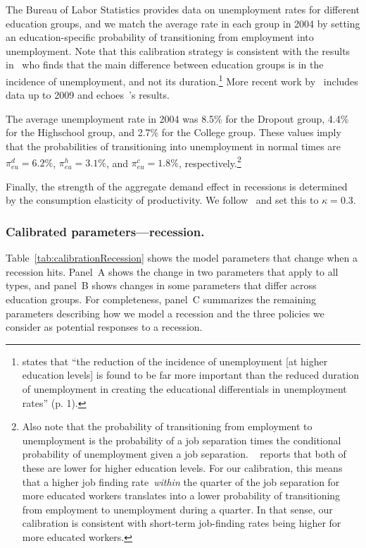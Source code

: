 \documentclass[\latexroot/\projectname]{subfiles}
\begin{document}
The Bureau of Labor Statistics provides data on unemployment rates for different education groups, and we match the average rate in each group in 2004 by setting an education-specific probability of transitioning from employment into unemployment.
Note that this calibration strategy is consistent with the results in~\cite{mincer1991education} who finds that the main difference between education groups is in the incidence of unemployment, and not its duration.\footnote{\cite{mincer1991education} states that ``the reduction of the incidence of unemployment [at higher education levels] is found to be far more important than the reduced duration of unemployment in creating the educational differentials in unemployment rates'' (p. 1).} More recent work by~\cite{elsby2010labor} includes data up to 2009 and echoes~\citeauthor{mincer1991education}'s results.

The average unemployment rate in 2004 was 8.5\% for the Dropout group, 4.4\% for the Highschool group, and 2.7\% for the College group.
These values imply that the probabilities of transitioning into unemployment in normal times are $\pi_{eu}^d=6.2\%$, $\pi_{eu}^h=3.1\%$, and $\pi_{eu}^c=1.8\%$, respectively.\footnote{Also note that the probability of transitioning from employment to unemployment is the probability of a job separation times the conditional probability of unemployment given a job separation.
  ~\cite{mincer1991education} reports that both of these are lower for higher education levels.
  For our calibration, this means that a higher job finding rate~\textit{within} the quarter of the job separation for more educated workers translates	into a lower probability of transitioning from employment to unemployment during a quarter.
  In that sense, our calibration is consistent with short-term job-finding rates being higher for more educated workers.}

Finally, the strength of the aggregate demand effect in recessions is determined by the consumption elasticity of productivity.
We follow~\cite{kmpHandbook} and set this to $\kappa=0.3$.

\subsubsection{Calibrated parameters---recession.}
\whenintegrated{\label{sec:calibRecession}}

Table~\ref{tab:calibrationRecession} shows the model parameters that change when a recession hits. Panel~A shows the change in two parameters that apply to all types, and panel~B shows changes in some parameters that differ across education groups. For completeness, panel~C summarizes the remaining parameters describing how we model a recession and the three policies we consider as potential responses to a recession.
\end{document}
